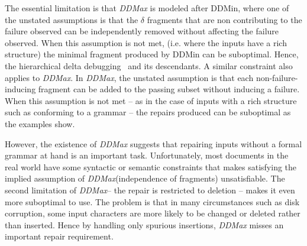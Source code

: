 \documentclass[sigconf,review,anonymous]{acmart}
\newcounter{todocounter}
\newcommand{\todo}[1]{\marginpar{$|$}\textcolor{red}{\stepcounter{todocounter}\footnote[\thetodocounter]{\textcolor{red}{\textbf{TODO }}\textit{#1}}}}
\newcommand{\recheck}[1]{\textcolor{red}{#1}}
\renewcommand{\todo}[1]{}
\newcommand{\ddmin}{\textit{ddmin}\xspace}
\def\ddmin{DDMin\xspace}
\newcommand{\ddmax}{\textit{DDMax}\xspace}
\newcommand{\brepair}{\textit{BRepair}\xspace}
\begin{document}
%
%
%
%
%




\todo{to Move/restructure}
The essential limitation is that \ddmax is modeled after \ddmin, where one of
the unstated assumptions is that the $\delta$ fragments that are non
contributing to the failure observed can be independently removed without
affecting the failure observed. When this assumption is not met, (i.e. where
the inputs have a rich structure) the minimal fragment produced by \ddmin
can be suboptimal. Hence, the hierarchical delta debugging~\cite{misherghi2006hdd}
and its descendants. A similar constraint also applies to \ddmax. In \ddmax,
the unstated assumption is that each non-failure-inducing fragment
can be added to the passing subset without inducing a failure. When this
assumption is not met -- as in the case of inputs with a rich structure such as
conforming to a grammar -- the repairs produced can be suboptimal as the
examples show.

\todo{to Move/restructure}
However, the existence of \ddmax suggests that repairing inputs without a formal
grammar at hand is an important task. Unfortunately, most documents in the real
world have some syntactic or semantic constraints that makes satisfying the
implied assumption of \ddmax (independence of fragments) unsatisfiable.  The
second limitation of \ddmax -- the repair is restricted to deletion -- makes it
even more suboptimal to use. The problem is that in many circumstances such as
disk corruption, some input characters are more likely to be changed or deleted
rather than inserted. Hence by handling only spurious insertions, \ddmax misses
an important repair requirement.
\end{document}
